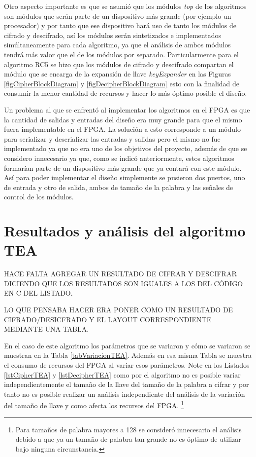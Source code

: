 Otro aspecto importante es que se asumió que los módulos \textit{top} de los algoritmos son módulos que serán parte de un dispositivo más grande (por ejemplo un procesador) y por tanto que ese dispositivo hará uso de tanto los módulos de cifrado y descifrado, así los módulos serán sintetizados e implementados simúltaneamente para cada algoritmo, ya que el análisis de ambos módulos tendrá más valor que el de los módulos por separado. Particularmente para el algoritmo RC5 se hizo que los módulos de cifrado y descifrado compartan el módulo que se encarga de la expansión de llave \textit{keyExpander} en las Figuras \ref{figCipherBlockDiagram} y \ref{figDecipherBlockDiagram} esto con la finalidad de consumir la menor cantidad de recursos y hacer lo más óptimo posible el diseño.


Un problema al que se enfrentó al implementar los algoritmos en el FPGA es que la cantidad de salidas y entradas del diseño era muy grande para que el mismo fuera implementable en el FPGA. La solución a esto corresponde a un módulo para serializar y deserializar las entradas y salidas pero el mismo no fue implementado ya que no era uno de los objetivos del proyecto, además de que se considero innecesario ya que, como se indicó anteriormente, estos algoritmos formarían parte de un dispositivo más grande que ya contará con este módulo. Así para poder implementar el diseño simplemente se pusieron dos puertos, uno de entrada y otro de salida, ambos de tamaño de la palabra y las señales de control de los módulos.

\section{Resultados y análisis del algoritmo TEA}
HACE FALTA AGREGAR UN RESULTADO DE CIFRAR Y DESCIFRAR DICIENDO QUE LOS RESULTADOS SON IGUALES A LOS DEL CÓDIGO EN C DEL LISTADO.

LO QUE PENSABA HACER ERA PONER COMO UN RESULTADO DE CIFRADO/DESICFRADO Y EL LAYOUT CORRESPONDIENTE MEDIANTE UNA TABLA.


En el caso de este algoritmo los parámetros que se variaron y cómo se variaron se muestran en la Tabla \ref{tabVariacionTEA}. Además en esa misma Tabla se muestra el consumo de recursos del FPGA al variar esos parámetros. Note en los Listados \ref{lstCipherTEA} y \ref{lstDecipherTEA} como por el algoritmo no es posible variar independientemente el tamaño de la llave del tamaño de la palabra a cifrar y por tanto no es posible realizar un análisis independiente del análisis de la variación del tamaño de llave y como afecta los recursos del FPGA. \footnote{Para tamaños de palabra mayores a 128 se consideró innecesario el análisis debido a que ya un tamaño de palabra tan grande no es óptimo de utilizar bajo ninguna circunstancia.}

